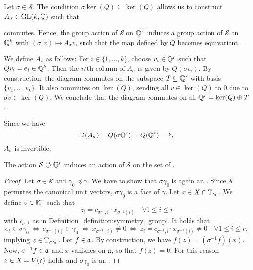 \begin{remark}
	\label{remark:symmetry_group_on_image}
	Let $\sigma\in\mathcal{S}$. The condition $\sigma \ker(Q) \subseteq \ker(Q)$ allows us to construct $A_\sigma\in\text{GL}(k,\mathbb{Q})$ such that
	\begin{center}
	\end{center}
	commutes. Hence, the group action of $\mathcal{S}$ on $\mathbb{Q}^r$ induces a group action of $\mathcal{S}$ on $\mathbb{Q}^k$ with $(\sigma,v) \mapsto A_\sigma v$, such that the map defined by $Q$ becomes equivariant.
	
	We define $A_\sigma$ as follows: For $i\in\{1,\dots,k\}$, choose $v_i\in\mathbb{Q}^r$ such that $Q v_i = e_i\in\mathbb{Q}^k$. Then the $i$\=/th column of $A_\sigma$ is given by $Q(\sigma v_i)$. By construction, the diagram commutes on the subspace $T\subseteq\mathbb{Q}^r$ with basis $\{v_1,\dots,v_k\}$. It also commutes on $\ker(Q)$, sending all $v\in\ker(Q)$ to $0$ due to $\sigma v\in\ker(Q)$. We conclude that the diagram commutes on all $\mathbb{Q}^r = \ker(Q) \oplus T$.
	
	Since we have
	$$\Im(A_\sigma) = Q(\sigma\mathbb{Q}^r) = Q(\mathbb{Q}^r) = k,$$
	$A_\sigma$ is invertible.
\end{remark}

\begin{lemma}
	\label{lemma:symmetry_group_on_afaces}
	The action $\mathcal{S}{\ \circlearrowleft\ }\mathbb{Q}^r$ induces an action of $\mathcal{S}$ on the set of \afaces{}.
\end{lemma}
\begin{proof}
	Let $\sigma\in\mathcal{S}$ and $\gamma_0\preceq\gamma$. We have to show that $\sigma\gamma_0$ is again an \aface{}. Since $\mathcal{S}$ permutes the canonical unit vectors, $\sigma\gamma_0$ is a face of $\gamma$. Let $x\in X\cap \mathbb{T}_{\gamma_0}$. We define $z\in\mathbb{K}^r$ such that
	$$z_i = c_{\sigma^{-1},i} \cdot x_{\sigma^{-1}(i)}\quad\forall 1\leq i \leq r$$
	with $c_{\sigma^{-1}}$ as in Definition~\ref{definition:symmetry_group}. It holds that
	$$
	e_i\in\sigma\gamma_0
	\ \Leftrightarrow\ e_{\sigma^{-1}(i)}\in\gamma_0
	\ \Leftrightarrow\ x_{\sigma^{-1}(i)} \neq 0
	\ \Leftrightarrow\ z_i = c_{\sigma^{-1},i} \cdot x_{\sigma^{-1}(i)} \neq 0
	\quad\forall 1\leq i\leq r,
	$$
	implying $z\in\mathbb{T}_{\sigma\gamma_0}$. Let $f\in\mathfrak{a}$. By construction, we have $f(z) = (\sigma^{-1}f)(x)$. Now, $\sigma^{-1}f\in\mathfrak{a}$ and $x$ vanishes on $\mathfrak{a}$, so that $f(z) = 0$. For this reason $z\in X = V(\mathfrak{a})$ holds and $\sigma\gamma_0$ is an \aface{}.
\end{proof}

